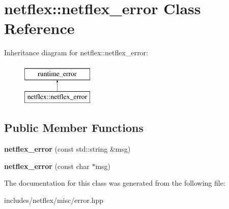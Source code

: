 \hypertarget{classnetflex_1_1netflex__error}{}\section{netflex\+:\+:netflex\+\_\+error Class Reference}
\label{classnetflex_1_1netflex__error}
Inheritance diagram for netflex\+:\+:netflex\+\_\+error\+:\begin{figure}[H]
\begin{center}
\leavevmode
\includegraphics[height=2.000000cm]{classnetflex_1_1netflex__error}
\end{center}
\end{figure}
\subsection*{Public Member Functions}
\begin{DoxyCompactItemize}
\item 
\mbox{\label{classnetflex_1_1netflex__error_ac7410912ae60826d4d3c517bc77bd53d}} 
{\bfseries netflex\+\_\+error} (const std\+::string \&msg)
\item 
\mbox{\label{classnetflex_1_1netflex__error_a1b16bd2445517eed5b9e0e276e73a023}} 
{\bfseries netflex\+\_\+error} (const char $\ast$msg)
\end{DoxyCompactItemize}


The documentation for this class was generated from the following file\+:\begin{DoxyCompactItemize}
\item 
includes/netflex/misc/error.\+hpp\end{DoxyCompactItemize}
